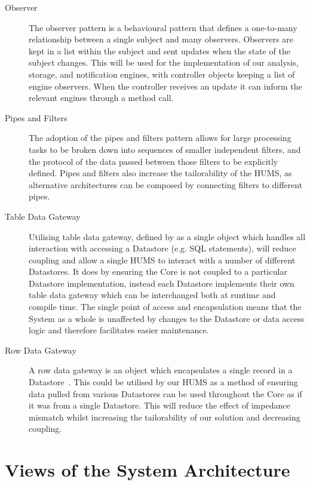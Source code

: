 \documentclass[10pt,a4paper]{article}
\begin{document}
\begin{description}
\item[Observer] The observer pattern is a behavioural pattern that defines a one-to-many relationship between a single subject and many observers. Observers are kept in a list within the subject and sent updates when the state of the subject changes. This will be used for the implementation of our analysis, storage, and notification engines, with controller objects keeping a list of engine observers. When the controller receives an update it can inform the relevant engines through a method call.
\item[Pipes and Filters] The adoption of the pipes and filters pattern allows for large processing tasks to be broken down into sequences of smaller independent filters, and the protocol of the data passed between those filters to be explicitly defined. Pipes and filters also increase the tailorability of the HUMS, as alternative architectures can be composed by connecting filters to different pipes.
\item[Table Data Gateway] Utilising table data gateway, defined by \cite{fowler2002patterns} as a single object which handles all interaction with accessing a Datastore (e.g. SQL statements), will reduce coupling and allow a single HUMS to interact with a number of different Datastores. It does by ensuring the Core is not coupled to a particular Datastore implementation, instead each Datastore implements their own table data gateway which can be interchanged both at runtime and compile time. The single point of access and encapsulation means that the System as a whole is unaffected by changes to the Datastore or data access logic and therefore facilitates easier maintenance.
\item[Row Data Gateway] A row data gateway is an object which encapsulates a single record in a Datastore~\cite{fowler2002patterns}. This could be utilised by our HUMS as a method of ensuring data pulled from various Datastores can be used throughout the Core as if it was from a single Datastore. This will reduce the effect of impedance mismatch whilst increasing the tailorability of our solution and decreasing coupling.
\end{description}

\section{Views of the System Architecture} 
\label{sec:architecture}
\end{document}
